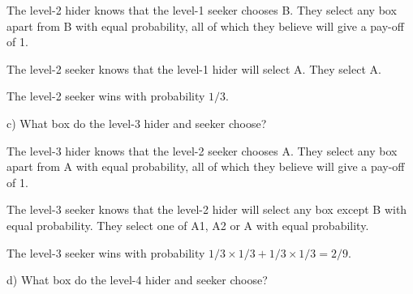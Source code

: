 \documentclass[
  letterpaper,
  DIV=11,
  numbers=noendperiod]{scrreprt}
\begin{document}
\begin{tcolorbox}[enhanced jigsaw, title=\textcolor{quarto-callout-tip-color}{\faLightbulb}\hspace{0.5em}{Answer}, toprule=.15mm, colback=white, breakable, titlerule=0mm, colframe=quarto-callout-tip-color-frame, coltitle=black, opacityback=0, rightrule=.15mm, colbacktitle=quarto-callout-tip-color!10!white, bottomtitle=1mm, opacitybacktitle=0.6, arc=.35mm, bottomrule=.15mm, toptitle=1mm, leftrule=.75mm, left=2mm]

The level-2 hider knows that the level-1 seeker chooses B. They select
any box apart from B with equal probability, all of which they believe
will give a pay-off of 1.

The level-2 seeker knows that the level-1 hider will select A. They
select A.

The level-2 seeker wins with probability \(1/3\).

\end{tcolorbox}

c) What box do the level-3 hider and seeker choose?

\begin{tcolorbox}[enhanced jigsaw, title=\textcolor{quarto-callout-tip-color}{\faLightbulb}\hspace{0.5em}{Answer}, toprule=.15mm, colback=white, breakable, titlerule=0mm, colframe=quarto-callout-tip-color-frame, coltitle=black, opacityback=0, rightrule=.15mm, colbacktitle=quarto-callout-tip-color!10!white, bottomtitle=1mm, opacitybacktitle=0.6, arc=.35mm, bottomrule=.15mm, toptitle=1mm, leftrule=.75mm, left=2mm]

The level-3 hider knows that the level-2 seeker chooses A. They select
any box apart from A with equal probability, all of which they believe
will give a pay-off of 1.

The level-3 seeker knows that the level-2 hider will select any box
except B with equal probability. They select one of A1, A2 or A with
equal probability.

The level-3 seeker wins with probability \(1/3×1/3+1/3×1/3=2/9\).

\end{tcolorbox}

d) What box do the level-4 hider and seeker choose?
\end{document}
